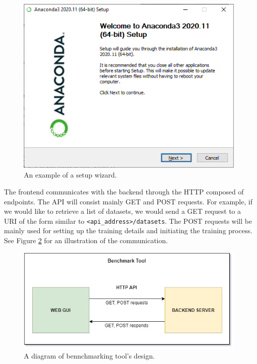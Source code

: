 \begin{figure}[h]
    \centering
    \includegraphics[width=0.65\linewidth]{Sources/Figures/anaconda.png}
    \caption{An example of a setup wizard.}
    \label{fig:wizard}
\end{figure}

The frontend communicates with the backend through the HTTP  composed of 
endpoints. The API will consist mainly GET and POST requests. For example, if we
would like to retrieve a list of datasets, we would send a GET request to a URI
of the form similar to \texttt{<api\_address>/datasets}. The POST requests will
be mainly used for setting up the training details and initiating the training
process. See Figure \ref{fig:tool_design} for an illustration of the communication.

\begin{figure}[h]
    \centering
    \includegraphics[width=0.85\linewidth]{Sources/Figures/tool_design.png}
    \caption{A diagram of bennchmarking tool's design.}
    \label{fig:tool_design}
\end{figure}

